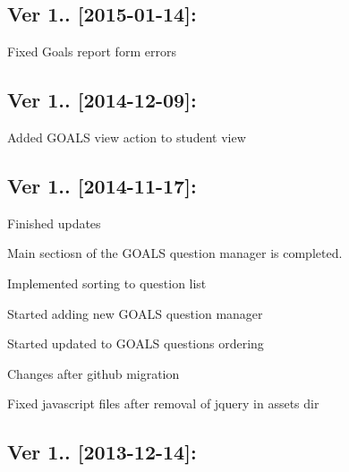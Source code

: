\subsection*{Ver 1.. \mbox{[}2015-\/01-\/14\mbox{]}\+: }


\begin{DoxyItemize}
\item Fixed Goals report form errors
\end{DoxyItemize}

\subsection*{Ver 1.. \mbox{[}2014-\/12-\/09\mbox{]}\+: }


\begin{DoxyItemize}
\item Added G\+O\+A\+L\+S view action to student view
\end{DoxyItemize}

\subsection*{Ver 1.. \mbox{[}2014-\/11-\/17\mbox{]}\+: }


\begin{DoxyItemize}
\item Finished updates
\item Main sectiosn of the G\+O\+A\+L\+S question manager is completed.
\item Implemented sorting to question list
\item Started adding new G\+O\+A\+L\+S question manager
\item Started updated to G\+O\+A\+L\+S questions ordering
\item Changes after github migration
\item Fixed javascript files after removal of jquery in assets dir
\end{DoxyItemize}

\subsection*{Ver 1.. \mbox{[}2013-\/12-\/14\mbox{]}\+: }


